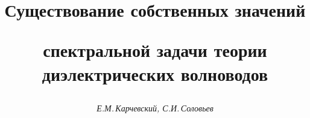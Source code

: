 

 


% 


\newcommand{\tts}[1]{} 


 




\setcounter{page}{78} 












 


\author{\it Е.М.\,Карчевский, С.И.\,Соловьев} 




\title{Существование собственных значений  


спектральной задачи теории диэлектрических волноводов} 


 


\date{} 




\pagestyle{plain} %


 




\maketitle 


\label{begin} 


 


